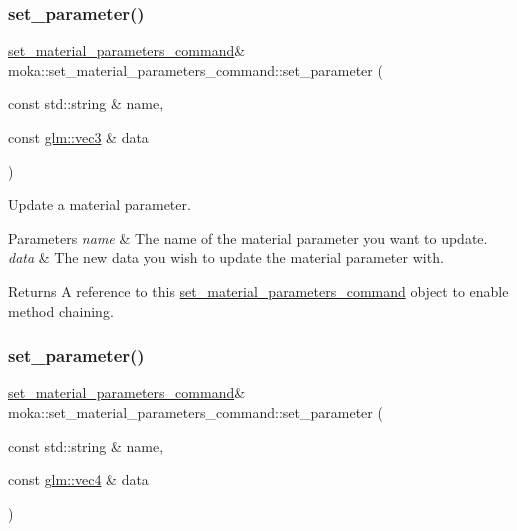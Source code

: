 \subsubsection{\texorpdfstring{set\_parameter()}{set\_parameter()}\hspace{0.1cm}{\footnotesize\ttfamily [2/6]}}
{\footnotesize\ttfamily \mbox{\hyperlink{classmoka_1_1set__material__parameters__command}{set\+\_\+material\+\_\+parameters\+\_\+command}}\& moka\+::set\+\_\+material\+\_\+parameters\+\_\+command\+::set\+\_\+parameter (\begin{DoxyParamCaption}\item[{const std\+::string \&}]{name,  }\item[{const \mbox{\hyperlink{namespacemoka_aed2224bc0e5b79e57a8975ded94ee1aaa97ade28e93c0de60adc075bdbe07ca36}{glm\+::vec3}} \&}]{data }\end{DoxyParamCaption})}



Update a material parameter. 


\begin{DoxyParams}{Parameters}
{\em name} & The name of the material parameter you want to update. \\
\hline
{\em data} & The new data you wish to update the material parameter with. \\
\hline
\end{DoxyParams}
\begin{DoxyReturn}{Returns}
A reference to this \mbox{\hyperlink{classmoka_1_1set__material__parameters__command}{set\+\_\+material\+\_\+parameters\+\_\+command}} object to enable method chaining. 
\end{DoxyReturn}
\mbox{\label{classmoka_1_1set__material__parameters__command_a7e79231e37e5e7bfc749da230abc4f71}} 
\subsubsection{\texorpdfstring{set\_parameter()}{set\_parameter()}\hspace{0.1cm}{\footnotesize\ttfamily [3/6]}}
{\footnotesize\ttfamily \mbox{\hyperlink{classmoka_1_1set__material__parameters__command}{set\+\_\+material\+\_\+parameters\+\_\+command}}\& moka\+::set\+\_\+material\+\_\+parameters\+\_\+command\+::set\+\_\+parameter (\begin{DoxyParamCaption}\item[{const std\+::string \&}]{name,  }\item[{const \mbox{\hyperlink{namespacemoka_aed2224bc0e5b79e57a8975ded94ee1aaa1a9028fd802c481a99491a418ca2fe86}{glm\+::vec4}} \&}]{data }\end{DoxyParamCaption})}



